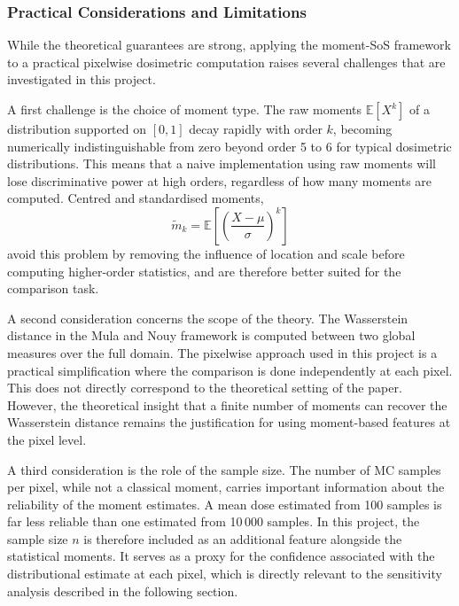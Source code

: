 \documentclass[12pt]{article}
\begin{document}
\subsubsection{Practical Considerations and Limitations}

While the theoretical guarantees are strong, applying the moment-SoS framework to a
practical pixelwise dosimetric computation raises several challenges that are
investigated in this project.

A first challenge is the choice of moment type. The raw moments $\mathbb{E}[X^k]$
of a distribution supported on $[0,1]$ decay rapidly with order $k$, becoming
numerically indistinguishable from zero beyond order 5 to 6 for typical dosimetric
distributions. This means that a naive implementation using raw moments will lose
discriminative power at high orders, regardless of how many moments are computed.
Centred and standardised moments,
\begin{equation}
    \tilde{m}_k = \mathbb{E}\!\left[\left(\frac{X - \mu}{\sigma}\right)^k\right]
\end{equation}
avoid this problem by removing the influence of location and scale before computing
higher-order statistics, and are therefore better suited for the comparison task.

A second consideration concerns the scope of the theory. The Wasserstein distance
in the Mula and Nouy framework is computed between two global measures over the full
domain. The pixelwise approach used in this project is a practical simplification
where the comparison is done independently at each pixel. This does not directly
correspond to the theoretical setting of the paper. However, the theoretical insight
that a finite number of moments can recover the Wasserstein distance remains the
justification for using moment-based features at the pixel level.

A third consideration is the role of the sample size. The number of MC samples per
pixel, while not a classical moment, carries important information about the
reliability of the moment estimates. A mean dose estimated from 100 samples is far
less reliable than one estimated from 10\,000 samples. In this project, the sample
size $n$ is therefore included as an additional feature alongside the statistical
moments. It serves as a proxy for the confidence associated with the distributional
estimate at each pixel, which is directly relevant to the sensitivity analysis
described in the following section.

\end{document}
